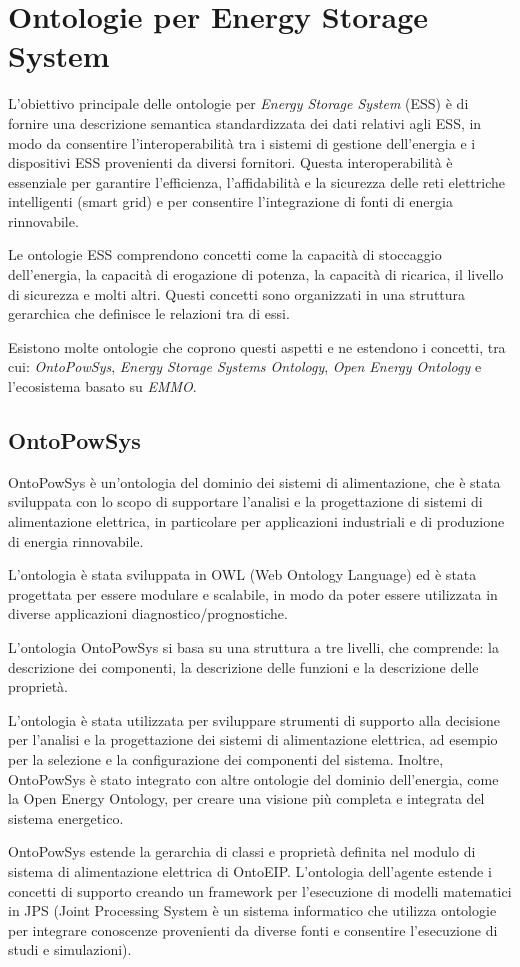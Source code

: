 \chapter{Ontologie per Energy Storage System}

L'obiettivo principale delle ontologie per \textit{Energy Storage System} (ESS)
è di fornire una descrizione
semantica standardizzata dei dati relativi agli ESS, in modo da consentire
l'interoperabilità tra i sistemi di gestione dell'energia e i dispositivi ESS
provenienti da diversi fornitori. Questa interoperabilità è essenziale per
garantire l'efficienza, l'affidabilità e la sicurezza delle reti elettriche
intelligenti (smart grid) e per consentire l'integrazione di fonti di energia
rinnovabile.

Le ontologie ESS comprendono concetti come la capacità di stoccaggio
dell'energia, la capacità di erogazione di potenza, la capacità di ricarica, il
livello di sicurezza e
molti altri. Questi concetti sono organizzati in una struttura gerarchica che
definisce le relazioni tra di essi.

Esistono molte ontologie che coprono questi aspetti e ne estendono i concetti,
tra cui: \textit{OntoPowSys}, \textit{Energy Storage Systems Ontology},
\textit{Open Energy Ontology} e l'ecosistema basato su \textit{EMMO}.

\section{OntoPowSys}
OntoPowSys è un'ontologia del dominio dei sistemi di alimentazione, che è stata
sviluppata con lo scopo di supportare l'analisi e la progettazione di sistemi
di alimentazione elettrica, in particolare per applicazioni industriali e di
produzione di energia rinnovabile.

L'ontologia è stata sviluppata in OWL (Web Ontology Language) ed è stata
progettata per essere modulare e scalabile, in modo da poter essere utilizzata
in diverse applicazioni diagnostico/prognostiche.

L'ontologia OntoPowSys si basa su una struttura a tre livelli, che comprende:
la descrizione dei componenti, la descrizione delle funzioni e la descrizione
delle proprietà.

L'ontologia è stata utilizzata per sviluppare strumenti di supporto alla
decisione per l'analisi e la progettazione dei sistemi di alimentazione
elettrica, ad esempio per la selezione e la configurazione dei componenti del
sistema. Inoltre, OntoPowSys è stato integrato con altre ontologie del dominio
dell'energia, come la Open Energy Ontology, per creare una visione più completa
e integrata del sistema energetico.

OntoPowSys estende la gerarchia di classi e proprietà definita nel modulo di
sistema di alimentazione elettrica di OntoEIP. L'ontologia dell'agente estende
i concetti di supporto creando un framework per l'esecuzione di modelli
matematici in JPS (Joint Processing System è un sistema informatico che
utilizza ontologie per integrare conoscenze provenienti da diverse fonti e
consentire l'esecuzione di studi e simulazioni).